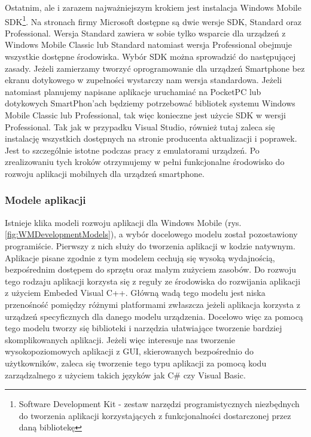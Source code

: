 Ostatnim, ale i zarazem najważniejszym krokiem jest instalacja Windows Mobile
SDK\footnote{Software Development Kit - zestaw narzędzi programistycznych
niezbędnych do tworzenia aplikacji korzystających z funkcjonalności dostarczonej
przez daną bibliotekę}. Na stronach firmy Microsoft dostępne są dwie wersje SDK,
Standard oraz Professional. Wersja Standard zawiera w sobie tylko wsparcie dla
urządzeń z Windows Mobile Classic lub Standard natomiast wersja Professional
obejmuje wszystkie dostępne środowiska. Wybór SDK można sprowadzić do
następującej zasady. Jeżeli zamierzamy tworzyć oprogramowanie dla urządzeń
Smartphone bez ekranu dotykowego w zupełności wystarczy nam wersja standardowa.
Jeżeli natomiast planujemy napisane aplikacje uruchamiać na PocketPC lub
dotykowych SmartPhon'ach będziemy potrzebować bibliotek systemu Windows Mobile
Classic lub Professional, tak więc konieczne jest użycie SDK w wersji
Professional. Tak jak w przypadku Visual Studio, również tutaj zaleca się
instalację wszystkich dostępnych na stronie producenta aktualizacji i poprawek.
Jest to szczególnie istotne podczas pracy z emulatorami urządzeń. Po
zrealizowaniu tych kroków otrzymujemy w pełni funkcjonalne środowisko do rozwoju
aplikacji mobilnych dla urządzeń smartphone.

\subsubsection{Modele aplikacji}
Istnieje klika modeli rozwoju aplikacji dla Windows Mobile (rys. \ref{fig:WMDevelopmentModels}), a wybór docelowego
modelu został pozostawiony programiście. Pierwszy z nich służy do tworzenia
aplikacji w kodzie natywnym. Aplikacje pisane zgodnie z tym modelem cechują się
wysoką wydajnością, bezpośrednim dostępem do sprzętu oraz małym zużyciem zasobów.
Do rozwoju tego rodzaju aplikacji korzysta się z reguły ze środowiska do
rozwijania aplikacji z użyciem Embeded Visual C++. Główną wadą tego modelu jest
niska przenośność pomiędzy różnymi platformami zwłaszcza jeżeli aplikacja
korzysta z urządzeń specyficznych dla danego modelu urządzenia. Docelowo więc za
pomocą tego modelu tworzy się biblioteki i narzędzia ułatwiające tworzenie
bardziej skomplikowanych aplikacji. Jeżeli więc interesuje nas tworzenie
wysokopoziomowych aplikacji z GUI, skierowanych bezpośrednio do użytkowników,
zaleca się tworzenie tego typu aplikacji za pomocą kodu zarządzalnego z użyciem
takich języków jak C\# czy Visual Basic.

